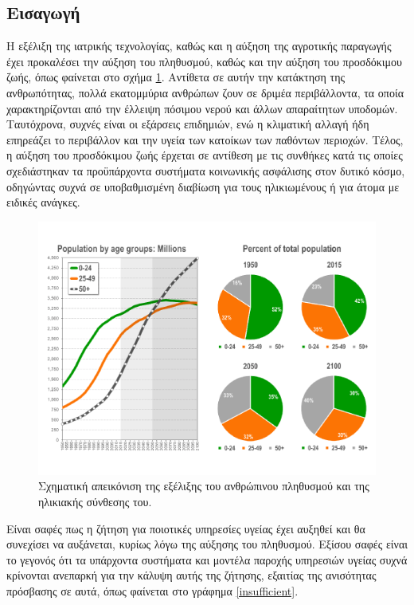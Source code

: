 \subsection{Εισαγωγή}
Η εξέλιξη της ιατρικής τεχνολογίας, καθώς και η αύξηση της αγροτικής παραγωγής έχει προκαλέσει την αύξηση του πληθυσμού, καθώς και την αύξηση του προσδόκιμου ζωής, όπως φαίνεται στο σχήμα \ref{human_population}.
Αντίθετα σε αυτήν την κατάκτηση της ανθρωπότητας, πολλά εκατομμύρια ανθρώπων ζουν σε δριμέα περιβάλλοντα, τα οποία χαρακτηρίζονται από την έλλειψη πόσιμου νερού και άλλων απαραίτητων υποδομών.
Ταυτόχρονα, συχνές είναι οι εξάρσεις επιδημιών, ενώ η κλιματική αλλαγή ήδη επηρεάζει το περιβάλλον και την υγεία των κατοίκων των παθόντων περιοχών.
Τέλος, η αύξηση του προσδόκιμου ζωής έρχεται σε αντίθεση με τις συνθήκες κατά τις οποίες σχεδιάστηκαν τα προϋπάρχοντα συστήματα κοινωνικής ασφάλισης στον δυτικό κόσμο, οδηγώντας συχνά σε υποβαθμισμένη διαβίωση για τους ηλικιωμένους ή για άτομα με ειδικές ανάγκες.
\begin{figure}[h!]
\includegraphics[scale=0.4]{images/human_population.png}
\centering
\caption{Σχηματική απεικόνιση της εξέλιξης του ανθρώπινου πληθυσμού και της ηλικιακής σύνθεσης του. \cite{human_population}}
\label{human_population}
\end{figure}
Είναι σαφές πως η ζήτηση για ποιοτικές υπηρεσίες υγείας έχει αυξηθεί και θα συνεχίσει να αυξάνεται, κυρίως λόγω της αύξησης του πληθυσμού. \cite{Lubitz2003} 
Εξίσου σαφές είναι το γεγονός ότι τα υπάρχοντα συστήματα και μοντέλα παροχής υπηρεσιών υγείας συχνά κρίνονται ανεπαρκή για την κάλυψη αυτής της ζήτησης, εξαιτίας της ανισότητας πρόσβασης σε αυτά, όπως φαίνεται στο γράφημα \ref{insufficient}. 
